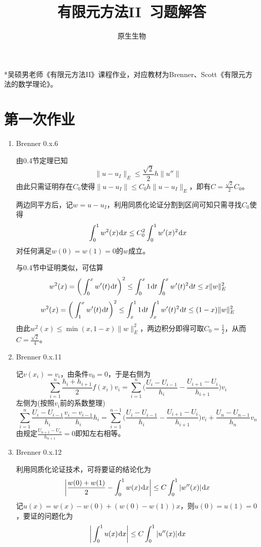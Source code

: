 \documentclass[a4paper,UTF8,fontset=windows,10pt]{ctexart}
\title{\heiti 有限元方法II\ 习题解答}
\author{原生生物}
\date{}
\newcommand*{\dr}{\hspace{0.07em}\mathrm{d}}
\begin{document}
\maketitle

*吴硕男老师《有限元方法II》课程作业，对应教材为Brenner、Scott《有限元方法的数学理论》。

\tableofcontents

\newpage

\section{第一次作业}
\begin{enumerate}
    \item Brenner 0.x.6
    
    由0.4节定理已知
    $$\|u-u_I\|_E\le\frac{\sqrt2}{2}h\|u''\|$$
    由此只需证明存在$C_0$使得$\|u-u_I\|\le C_0h\|u-u_I\|_E$，即有$C=\frac{\sqrt2}{2}C_0$。
        
    两边同平方后，记$w=u-u_I$，利用同质化论证分割到区间可知只需寻找$C_0$使得
    $$\int_0^1w^2(x)\dr x\le C_0^2\int_0^1w'(x)^2\dr x$$
    对任何满足$w(0)=w(1)=0$的$w$成立。
    
    与0.4节中证明类似，可估算
    $$w^2(x)=\bigg(\int_0^xw'(t)\dr t\bigg)^2\le\int_0^x1\dr t\int_0^xw'(t)^2\dr t\le x\|w\|_E^2$$
    $$w^2(x)=\bigg(\int_1^xw'(t)\dr t\bigg)^2\le\int_x^11\dr t\int_x^1w'(t)^2\dr t\le (1-x)\|w\|_E^2$$
    由此$w^2(x)\le\min(x,1-x)\|w\|_E^2$，两边积分即得可取$C_0=\frac{1}{2}$，从而$C=\frac{\sqrt2}{4}$。
    
    \item Brenner 0.x.11
    
    记$v(x_i)=v_i$，由条件$v_0=0$，于是右侧为
    $$\sum_{i=1}^n\frac{h_i+h_{i+1}}{2}f(x_i)v_i=\sum_{i=1}^n\bigg(\frac{U_i-U_{i-1}}{h_i}-\frac{U_{i+1}-U_i}{h_{i+1}}\bigg)v_i$$
    左侧为(按照$v_i$前的系数整理)
    $$\sum_{i=1}^n\frac{U_i-U_{i-1}}{h_i}\frac{v_i-v_{i-1}}{h_i}h_i=\sum_{i=1}^{n-1}\bigg(\frac{U_i-U_{i-1}}{h_i}-\frac{U_{i+1}-U_i}{h_{i+1}}\bigg)v_i+\frac{U_n-U_{n-1}}{h_n}v_n$$
    由规定$\frac{U_{n+1}-U_n}{h_{n+1}}=0$即知左右相等。
    
    \item Brenner 0.x.12
    
    利用同质化论证技术，可将要证的结论化为
    $$\bigg|\frac{w(0)+w(1)}{2}-\int_0^1w(x)\dr x\bigg|\le C\int_0^1|w''(x)|\dr x$$
    记$u(x)=w(x)-w(0)+(w(0)-w(1))x$，则$u(0)=u(1)=0$，要证的问题化为
    $$\bigg|\int_0^1u(x)\dr x\bigg|\le C\int_0^1|u''(x)|\dr x$$
    

\end{enumerate}
\end{document}

